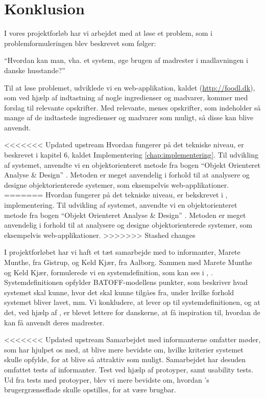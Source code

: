 \chapter{Konklusion}
\label{chap:konklusion}

I vores projektforløb har vi arbejdet med at løse et problem, som i problemformuleringen blev beskrevet som følger:

``Hvordan kan man, vha. et system, øge brugen af madrester i madlavningen i danske husstande?''

Til at løse problemet, udviklede vi en web-applikation, kaldet \Foodl{} (\url{http://foodl.dk}), som ved hjælp af indtastning af nogle ingredienser og madvarer, kommer med forslag til relevante opskrifter. Med relevante, menes opskrifter, som indeholder så mange af de indtastede ingredienser og madvarer som muligt, så disse kan blive anvendt.

<<<<<<< Updated upstream
Hvordan \Foodl{} fungerer på det tekniske niveau, er beskrevet i kapitel 6, kaldet Implementering \ref{chap:implementering}. Til udvikling af systemet, anvendte vi en objektorienteret metode fra bogen ``Objekt Orienteret Analyse \& Design'' \cite{ooad}. Metoden er meget anvendelig i forhold til at analysere og designe objektorienterede systemer, som eksempelvis web-applikationer. 
=======
Hvordan \Foodl{} fungerer på det tekniske niveau, er bekskrevet i , implementering. Til udvikling af systemet, anvendte vi en objektorienteret metode fra bogen ``Objekt Orienteret Analyse \& Design'' \cite{ooad}. Metoden er meget anvendelig i forhold til at analysere og designe objektorienterede systemer, som eksempelvis web-applikationer. 
>>>>>>> Stashed changes

I projektforløbet har vi haft et tæt samarbejde med to informanter, Marete Munthe, fra Gistrup, og Keld Kjær, fra Aalborg. Sammen med Marete Munthe og Keld Kjær, formulerede vi en systemdefinition, som kan ses i , . Systemdefinitionen opfylder BATOFF-modellens punkter, som beskriver hvad systemet skal kunne, hvor det skal kunne tilgåes fra, under hvilke forhold systemet bliver lavet, mm. Vi konkludere, at \Foodl{} lever op til systemdefinitionen, og at det, ved hjælp af \Foodl{}, er blevet lettere for danskerne, at få inspiration til, hvordan de kan få anvendt deres madrester.

<<<<<<< Updated upstream
Samarbejdet med informanterne omfatter møder, som har hjulpet os med, at blive mere bevidste om, hvilke kriterier systemet skulle opfylde, for at blive så attraktiv som muligt. Samarbejdet har desuden omfattet tests af informanter. Test ved hjælp af protoyper, samt usability tests. Ud fra tests med protoyper, blev vi mere bevidste om, hvordan \Foodl{}'s brugergrænseflade skulle opstilles, for at være brugbar. 

